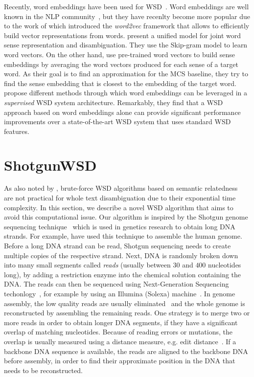 \documentclass[11pt]{article}
\begin{document}
Recently, word embeddings have been used for WSD~\cite{Chen-EMNLP-2014,Bhingardive-NAACL-2015,Navigli-ACL-2016}. Word embeddings are well known in the NLP community~\cite{Bengio-JMLR-2003,Collobert-ICML-2008}, but they have recenlty become more popular due to the work of  which introduced the \emph{word2vec} framework that allows to efficiently build vector representations from words.  present a unified model for joint word sense representation and disambiguation. They use the Skip-gram model to learn word vectors. On the other hand,  use pre-trained word vectors to build sense embeddings by averaging the word vectors produced for each sense of a target word. As their goal is to find an approximation for the MCS baseline, they try to find the sense embedding that is closest to the embedding of the target word.  propose different methods through which word embeddings can be leveraged in a \emph{supervised} WSD system architecture. Remarkably, they find that a WSD approach based on word embeddings alone can provide significant performance improvements over a state-of-the-art WSD system that uses standard WSD features.

\section{ShotgunWSD}
\label{sec_ShotgunWSD} 

As also noted by , brute-force WSD algorithms based on semantic relatedness~\cite{Patwardhan-CICLing-2003} are not practical for whole text disambiguation due to their exponential time complexity. In this section, we describe a novel WSD algorithm that aims to avoid this computational issue. 
Our algorithm is inspired by the Shotgun genome sequencing technique~\cite{Shotgun-1981} which is used in genetics research to obtain long DNA strands. For example,  have used this technique to assemble the human genome. Before a long DNA strand can be read, Shotgun sequencing needs to create multiple copies of the respective strand. Next, DNA is randomly broken down into many small segments called \emph{reads} (usually between $30$ and $400$ nucleotides long), by adding a restriction enzyme into the chemical solution containing the DNA. The reads can then be sequenced using Next-Generation Sequencing techonlogy~\cite{Karl-NGS-2009}, for example by using an Illumina (Solexa) machine~\cite{Solexa-2004}. In genome assembly, the low quality reads are usually eliminated~\cite{NGS-QC-PLoS-2012} and the whole genome is reconstructed by assembling the remaining reads. One strategy is to merge two or more reads in order to obtain longer DNA segments, if they have a significant overlap of matching nucleotides. Because of reading errors or mutations, the overlap is usually measured using a distance measure, e.g. edit distance~\cite{levenshtein-1966}. If a backbone DNA sequence is available, the reads are aligned to the backbone DNA before assembly, in order to find their approximate position in the DNA that needs to be reconstructed.
\end{document}
